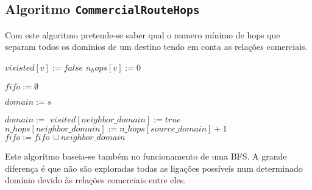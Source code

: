 \documentclass{article}
\begin{document}
\subsection{Algoritmo \texttt{CommercialRouteHops}}

Com este algoritmo pretende-se saber qual o numero mínimo de hops que separam todos os domínios de um destino tendo em conta as relações comerciais.

\begin{algorithm}[H]
\caption{}
\label{al:generatecode}
\begin{algorithmic}
		\State $visisted[v] := false$
		\State $n_hops[v] := 0$
	\EndFor
	
	\State{}
	\State $fifo := \emptyset$

	\State $domain := s$

	
		
		\State{} 
						
			\State{}

			\State{}
		\EndIf
		
		
		\State $domain :=$
	\EndWhile
\EndFunction
\State
{}
			\State $visited[neighbor\_domain] := true$
			\State $n\_hops[neighbor\_domain] := n\_hops[source\_domain] + 1$
			\State $fifo := fifo \ \cup neighbor\_domain$
		
		\EndIf
	\EndFor
\EndFunction
\end{algorithmic}
\end{algorithm}

Este algoritmo baseia-se também no funcionamento de uma BFS. A grande diferença é que não são exploradas todas as ligações possíveis num determinado domínio devido às relações comerciais entre eles.
\end{document}
